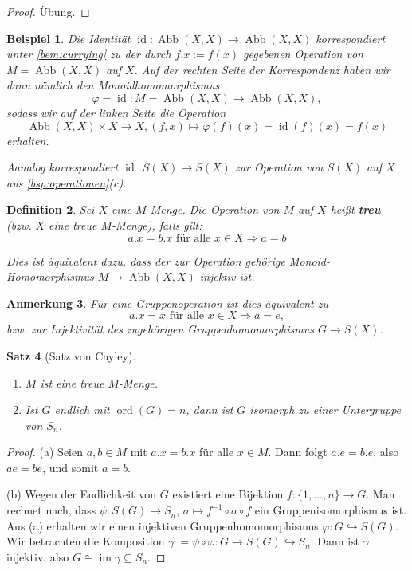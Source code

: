 \documentclass[a4paper, twoside, 11pt, ngerman]{report}
\DeclareMathOperator{\Abb}{Abb}
\DeclareMathOperator{\ident}{id}
\DeclareMathOperator{\image}{im}
\DeclareMathOperator{\ord}{ord}
\theoremstyle{definistyle}
\newtheorem{satz}{Satz}[section]
\newtheorem{defini}[satz]{Definition}
\newtheorem{anm}[satz]{Anmerkung}
\newtheorem{bsp}[satz]{Beispiel}
\theoremstyle{remark}
\newcommand{\defn}[1]{\textit{\bfseries #1}}
\begin{document}
\begin{proof}
Übung.
\end{proof}

\begin{bsp}\label{bsp:abb_op}
Die Identität $\ident \colon \Abb(X, X) \to \Abb(X, X)$ korrespondiert unter \ref{bem:currying} zu der durch $f . x := f(x)$ gegebenen Operation von $M=\Abb(X, X)$ auf $X$. Auf der rechten Seite der Korrespondenz haben wir dann
nämlich den Monoidhomomorphismus
\[
\varphi=\ident\colon M=\Abb(X, X)\to \Abb(X, X),
\]
sodass wir auf der linken Seite die Operation
\[
\Abb(X, X)\times X\to X, (f,x)\mapsto \varphi(f)(x)=\ident(f)(x)=f(x)
\]
erhalten.

Aanalog korrespondiert $\ident \colon S(X) \to S(X)$ zur Operation von $S(X)$ auf $X$ aus \ref{bsp:operationen}(c).
\end{bsp}


\begin{defini}\label{def:true_op}
Sei $X$ eine $M$-Menge. Die Operation von $M$ auf $X$ heißt \defn{treu} (bzw. $X$ eine treue $M$-Menge), falls gilt:
\[
a . x = b . x \text{ für alle } x \in X \Rightarrow a = b
\]

Dies ist äquivalent dazu, dass der  zur Operation gehörige Monoid-Homomorphismus  $M \to \Abb(X, X)$ injektiv ist.
\end{defini}

\begin{anm}\label{anm:gruppenop_treu}
Für eine Gruppenoperation ist dies äquivalent zu
\[
a . x = x \text{ für alle } x \in X \Rightarrow a = e,
\]
bzw. zur Injektivität des zugehörigen Gruppenhomomorphismus $G \to S(X)$.
\end{anm}

\begin{satz}[Satz von Cayley]\label{satz:cayley}
\begin{enumerate}[label=(\alph*)]
    \item $M$ ist eine treue $M$-Menge.
    \item Ist $G$ endlich mit $\ord(G) = n$, dann ist $G$ isomorph zu einer Untergruppe von $S_n$.
\end{enumerate}
\end{satz}

\begin{proof}
(a) Seien $a, b \in M$ mit $a . x = b . x$ für alle $x \in M$. Dann folgt $a . e = b . e$, also $a e = b e$, und somit $a = b$.

(b) Wegen der Endlichkeit von $G$ existiert eine Bijektion $f \colon \{1, \dots, n\} \to G$. Man rechnet nach, dass $\psi \colon S(G) \to S_n$, $\sigma \mapsto f^{-1} \circ \sigma \circ f$ ein Gruppenisomorphismus ist. Aus (a) erhalten wir einen injektiven Gruppenhomomorphismus $\varphi \colon G \hookrightarrow S(G)$. Wir betrachten die Komposition $\gamma := \psi \circ \varphi \colon G \to S(G) \hookrightarrow S_n$. Dann ist $\gamma$ injektiv, also $G \cong \image \gamma \subseteq S_n$.
\end{proof}
\end{document}
